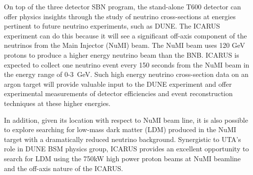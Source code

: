 On top of the three detector SBN program, the stand-alone T600 detector can offer physics insights through the study of neutrino cross-sections at energies pertinent to future neutrino experiments, such as DUNE. The ICARUS experiment can do this because it will see a significant off-axis component of the neutrinos from the Main Injector (NuMI) beam. The NuMI beam uses 120 GeV protons to produce a higher energy neutrino beam than the BNB. ICARUS is expected to collect one neutrino event every 150 seconds from the NuMI beam in the energy range of 0-3~GeV.  Such high energy neutrino cross-section data on an argon target will provide valuable input to the DUNE experiment and offer experimental measurements of detector efficiencies and event reconstruction techniques at these higher energies.

In addition, given its location with respect to NuMI beam line, it is also possible to explore searching for low-mass dark matter (LDM) produced in the NuMI target with a dramatically reduced neutrino background.  Synergistic to UTA's role in DUNE BSM physics group, ICARUS provides an excellent opportunity to search for LDM using the 750kW high power proton beams at NuMI beamline and the off-axis nature of the ICARUS.  


